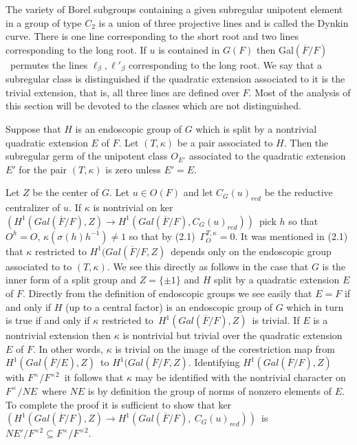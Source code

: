 The variety of Borel subgroups containing a given subregular unipotent element in a
group of type  $C_2$  is a union of three projective lines and is called the
Dynkin curve.  There is one line corresponding to the short root and two lines
corresponding to the long root.  If  $u$  is contained in  $G(F)$  then
Gal$(\overline{F}/F)$\ permutes the lines  $\ell_\beta , \ell'_\beta$  corresponding
to the long root.  We say that a subregular class is distinguished if the quadratic extension associated
to it is the trivial extension, that is, all three lines are defined over  $F$. 
Most of the analysis of this section will be devoted to the classes which are not
distinguished.

  Suppose that  $H$  is an endoscopic group of $G$ which is
split by a nontrivial quadratic extension  $E$ of $F$.  Let  $(T,\kappa)$     be a
pair associated to  $H$.  Then the subregular germ of the unipotent class  $O_{E'}$
associated to the quadratic extension  $E'$  for the pair  $(T,\kappa)$  is zero
unless $E' = E$.
\endproclaim

 Let $Z$ be the center of $G$.  Let $u \in O(F)$ and let $C_G(u)_{red}$
be the reductive centralizer of $u$.
If  $\kappa$  is nontrivial on  ker$(H^1(Gal(\overline{F}/F),Z)\to 
H^1(Gal(\overline{F}/F),  C_G(u)_{red}))$\
pick  $h$
so that  $O^h = O$, $\kappa(\sigma(h)h^{-1})\ne 1$  so that by (2.1)\
$\Gamma_O^{T,\kappa} = 0$. It was mentioned in (2.1) that $\kappa$ restricted to
$H^1(Gal(\overline{F}/F, Z)$\ depends only on the endoscopic group associated to
to  $(T,\kappa)$.  We see this directly as follows in the case that  $G$  is the 
inner form of a split group and  $Z = \{\pm 1\}$   and  $H$  split by a quadratic
extension $E$ of  $F$.  Directly from the definition of endoscopic groups we 
see easily that  $E = F$  if and only if  $H$ (up to a central factor) is an 
endoscopic group of  $G$  which in turn is true if and only if  $\kappa$ 
restricted to\ $H^1(Gal(\overline{F}/F), Z)$\ is trivial.  If  $E$  is a 
nontrivial extension then  $\kappa$ is nontrivial but trivial over the 
quadratic extension $E$ of $F$.  In other words,     $\kappa$ is trivial on the
image of the corestriction map from\ $H^1(Gal(\overline{F}/E), Z)$\ to
$H^1(Gal(\overline{F}/F, Z)$.  Identifying  $H^1(Gal(\overline{F}/F), Z)$ with
$F^\times/F^{\times 2}$\ it follows that  $\kappa$  may be identified with the
nontrivial character on  $F^\times/NE$\ where  $NE$  is by definition the group
of norms of nonzero elements of  $E$.  To complete the proof it is sufficient
to show that  ker$(H^1(Gal(\overline{F}/F),Z) \to H^1(Gal(\overline{F}/F),\
C_G(u)_{red}))$\ is\ $NE'/F^{\times 2} \subseteq F^\times/F^{\times 2}$. 

